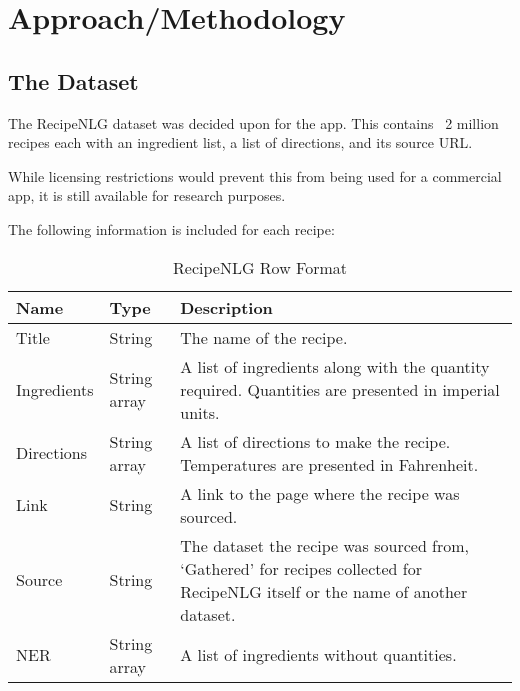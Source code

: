 \section{Approach/Methodology}

\subsection{The Dataset}


The RecipeNLG dataset \cite{bien_recipenlg_2020} was decided upon for the \chef{} app. This contains ~2 million recipes
each with an ingredient list, a list of directions, and its source URL.

While licensing restrictions would prevent this from being used for a commercial app, it is still available for
research purposes.

The following information is included for each recipe:

\begin{table}[h!]
    \begin{tabulary}{\textwidth}{|l|l|L|}
        \hline
        \textbf{Name} & \textbf{Type} & \textbf{Description} \\\hline

        Title & String & The name of the recipe. \\\hline

        Ingredients & String array & A list of ingredients along with the quantity required. Quantities are presented in imperial units. \\\hline

        Directions & String array & A list of directions to make the recipe. Temperatures are presented in Fahrenheit. \\\hline

        Link & String & A link to the page where the recipe was sourced. \\\hline

        Source & String & The dataset the recipe was sourced from, \enquote*{Gathered} for recipes collected for RecipeNLG itself or the name of another dataset. \\\hline

        NER & String array & A list of ingredients without quantities. \\\hline
    \end{tabulary}

    \caption{RecipeNLG Row Format}
    \label{tab:recipenlg_row_format}
\end{table}

